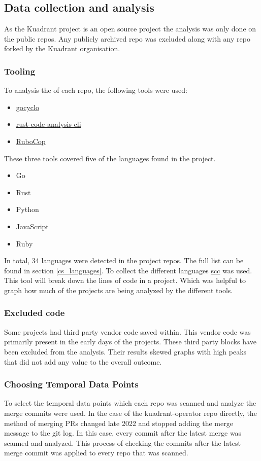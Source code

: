 \subsection{Data collection and analysis}
As the Kuadrant project is an open source project the analysis was only done on the public repos.
Any publicly archived repo was excluded along with any repo forked by the Kuadrant organisation.
\subsubsection{Tooling}
To analysis the \cc of each repo, the following tools were used:
\begin{itemize}
	\item \href{https://github.com/fzipp/gocyclo}{gocyclo}
	\item \href{https://github.com/mozilla/rust-code-analysis}{rust-code-analysis-cli}
	\item \href{https://rubocop.org/}{RuboCop}
\end{itemize}
These three tools covered five of the languages found in the project.
\begin{itemize}
	\item Go
	\item Rust
	\item Python
	\item JavaScript
	\item Ruby
\end{itemize}

In total, 34 languages were detected in the project repos.
The full list can be found in section \ref{cs_languages}.
To collect the different languages \href{https://github.com/boyter/scc}{scc} was used.
This tool will break down the lines of code in a project.
Which was helpful to graph how much of the projects are being analyzed by the different \cc tools.

\subsubsection{Excluded code}
Some projects had third party vendor code saved within.
This vendor code was primarily present in the early days of the projects.
These third party blocks have been excluded from the analysis.
Their results skewed graphs with high peaks that did not add any value to the overall outcome.

\subsubsection{Choosing Temporal Data Points}
To select the temporal data points which each repo was scanned and analyze the merge commits were used.
In the case of the kuadrant-operator repo directly, the method of merging PRs changed late 2022 and stopped adding the merge message to the git log.
In this case, every commit after the latest merge was scanned and analyzed.
This process of checking the commits after the latest merge commit was applied to every repo that was scanned.

